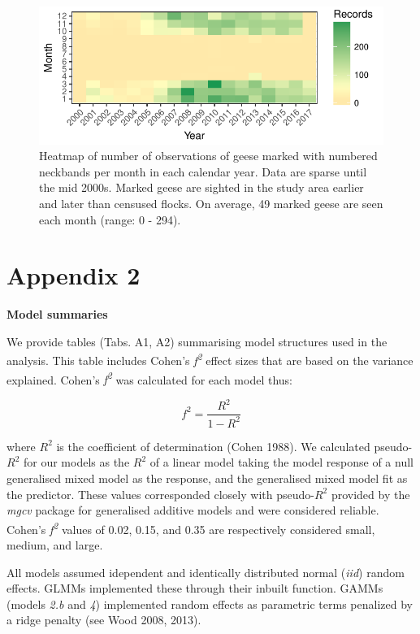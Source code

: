 \documentclass[10pt,twocolumn]{paper}
\begin{document}
\begin{figure}[H]
\includegraphics[width = 1.5\linewidth]{data_density_gorg.pdf}
\caption{{\small Heatmap of number of observations of geese marked with numbered neckbands per month in each calendar year. Data are sparse until the mid 2000s. Marked geese are sighted in the study area earlier and later than censused flocks. On average, 49 marked geese are seen each month (range: 0 - 294).}}

\end{figure}

\clearpage

\section{Appendix 2}\label{appendix-2}

\textbf{Model summaries} 

We provide tables (Tabs. A1, A2) summarising model structures used in
the analysis. This table includes Cohen's \emph{f\textsuperscript{2}}
effect sizes that are based on the variance explained. Cohen's
\emph{f\textsuperscript{2}} was calculated for each model thus:

\begin{equation} f^2 =  \frac{R^2}{1 - R^2} \end{equation}

where \(R^2\) is the coefficient of determination (Cohen 1988). We
calculated pseudo-\(R^2\) for our models as the \(R^2\) of a linear
model taking the model response of a null generalised mixed model as the
response, and the generalised mixed model fit as the predictor. These
values corresponded closely with pseudo-\(R^2\) provided by the
\emph{mgcv} package for generalised additive models and were considered
reliable. Cohen's \emph{f\textsuperscript{2}} values of 0.02, 0.15, and
0.35 are respectively considered small, medium, and large.

All models assumed idependent and identically distributed normal
(\emph{iid}) random effects. GLMMs implemented these through their
inbuilt function. GAMMs (models \emph{2.b} and \emph{4}) implemented
random effects as parametric terms penalized by a ridge penalty (see
Wood 2008, 2013).
\end{document}
